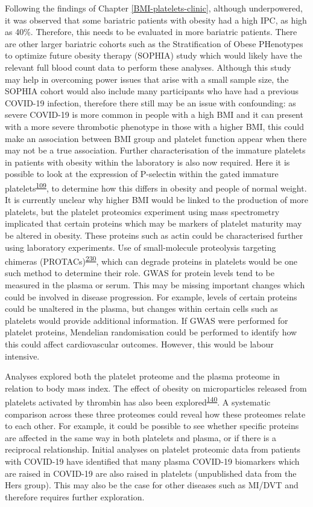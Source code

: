 \documentclass[11pt,twoside]{bristolthesis}
\begin{document}
Following the findings of Chapter \ref{BMI-platelets-clinic}, although underpowered, it was observed that some bariatric patients with obesity had a high IPC, as high as 40\%. Therefore, this needs to be evaluated in more bariatric patients. There are other larger bariatric cohorts such as the Stratification of Obese PHenotypes to optimize future obesity therapy (SOPHIA) study which would likely have the relevant full blood count data to perform these analyses. Although this study may help in overcoming power issues that arise with a small sample size, the SOPHIA cohort would also include many participants who have had a previous COVID-19 infection, therefore there still may be an issue with confounding: as severe COVID-19 is more common in people with a high BMI and it can present with a more severe thrombotic phenotype in those with a higher BMI, this could make an association between BMI group and platelet function appear when there may not be a true association. Further characterisation of the immature platelets in patients with obesity within the laboratory is also now required. Here it is possible to look at the expression of P-selectin within the gated immature platelets\textsuperscript{\protect\hyperlink{ref-Bernlochner2015a}{109}}, to determine how this differs in obesity and people of normal weight. It is currently unclear why higher BMI would be linked to the production of more platelets, but the platelet proteomics experiment using mass spectrometry implicated that certain proteins which may be markers of platelet maturity may be altered in obesity. These proteins such as actin could be characterised further using laboratory experiments. Use of small-molecule proteolysis targeting chimeras (PROTACs)\textsuperscript{\protect\hyperlink{ref-Sledz2020}{230}}, which can degrade proteins in platelets would be one such method to determine their role. GWAS for protein levels tend to be measured in the plasma or serum. This may be missing important changes which could be involved in disease progression. For example, levels of certain proteins could be unaltered in the plasma, but changes within certain cells such as platelets would provide additional information. If GWAS were performed for platelet proteins, Mendelian randomisation could be performed to identify how this could affect cardiovascular outcomes. However, this would be labour intensive.

Analyses explored both the platelet proteome and the plasma proteome in relation to body mass index. The effect of obesity on microparticles released from platelets activated by thrombin has also been explored\textsuperscript{\protect\hyperlink{ref-Grande2019}{140}}. A systematic comparison across these three proteomes could reveal how these proteomes relate to each other. For example, it could be possible to see whether specific proteins are affected in the same way in both platelets and plasma, or if there is a reciprocal relationship. Initial analyses on platelet proteomic data from patients with COVID-19 have identified that many plasma COVID-19 biomarkers which are raised in COVID-19 are also raised in platelets (unpublished data from the Hers group). This may also be the case for other diseases such as MI/DVT and therefore requires further exploration.
\end{document}
